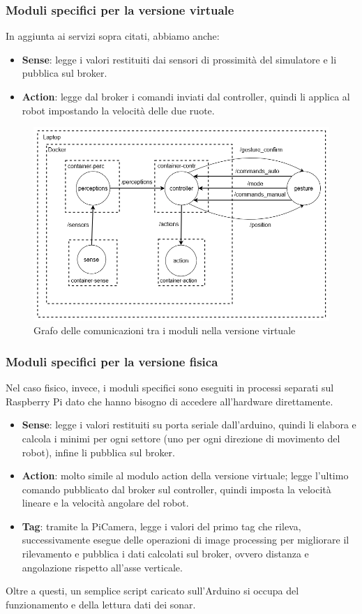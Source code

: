 \documentclass[]{article}
\begin{document}
\subsubsection*{Moduli specifici per la versione virtuale}
In aggiunta ai servizi sopra citati, abbiamo anche:
\begin{itemize}
    \item \textbf{Sense}: legge i valori restituiti dai sensori di prossimità del simulatore e li pubblica sul broker.
    \item \textbf{Action}: legge dal broker i comandi inviati dal controller, quindi li applica al robot impostando la velocità delle due ruote.
\end{itemize}

\begin{figure}[H]
    \centering
    \includegraphics[width=0.7\linewidth]{immagini/comunicazione_moduli_virtuale.png}    
    \caption{Grafo delle comunicazioni tra i moduli nella versione virtuale}
\end{figure}

\subsubsection*{Moduli specifici per la versione fisica}
Nel caso fisico, invece, i moduli specifici sono eseguiti in processi separati sul Raspberry Pi dato che hanno bisogno di accedere all'hardware direttamente.
\begin{itemize}
    \item \textbf{Sense}: legge i valori restituiti su porta seriale dall'arduino, quindi li elabora e calcola i minimi per ogni settore (uno per ogni direzione di movimento del robot), infine li pubblica sul broker.
    \item \textbf{Action}: molto simile al modulo action della versione virtuale; legge l'ultimo comando pubblicato dal broker sul controller, quindi imposta la velocità lineare e la velocità angolare del robot.
    \item \textbf{Tag}: tramite la PiCamera, legge i valori del primo tag che rileva, successivamente esegue delle operazioni di image processing per migliorare il rilevamento e pubblica i dati calcolati sul broker, ovvero distanza e angolazione rispetto all'asse verticale.
\end{itemize}
Oltre a questi, un semplice script caricato sull'Arduino si occupa del funzionamento e della lettura dati dei sonar.
\end{document}
